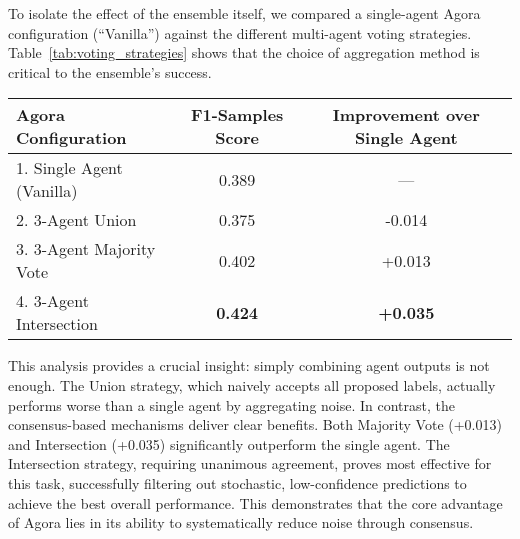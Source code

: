 To isolate the effect of the ensemble itself, we compared a single-agent Agora configuration (``Vanilla'') against the different multi-agent voting strategies. Table~\ref{tab:voting_strategies} shows that the choice of aggregation method is critical to the ensemble's success.

\begin{table*}[!ht]
\centering
\caption{Ablation of Agora Configurations on the English Dataset (F1-Samples).}
\label{tab:voting_strategies}
\begin{tabular}{lcc}
\hline
\textbf{Agora Configuration} & \textbf{F1-Samples Score} & \textbf{Improvement over Single Agent} \\
\hline
1. Single Agent (Vanilla) & 0.389 & --- \\
2. 3-Agent Union & 0.375 & -0.014 \\
3. 3-Agent Majority Vote & 0.402 & +0.013 \\
4. 3-Agent Intersection & \textbf{0.424} & \textbf{+0.035} \\
\hline
\end{tabular}
\end{table*}

This analysis provides a crucial insight: simply combining agent outputs is not enough. The Union strategy, which naively accepts all proposed labels, actually performs worse than a single agent by aggregating noise. In contrast, the consensus-based mechanisms deliver clear benefits. Both Majority Vote (+0.013) and Intersection (+0.035) significantly outperform the single agent. The Intersection strategy, requiring unanimous agreement, proves most effective for this task, successfully filtering out stochastic, low-confidence predictions to achieve the best overall performance. This demonstrates that the core advantage of Agora lies in its ability to systematically reduce noise through consensus.


